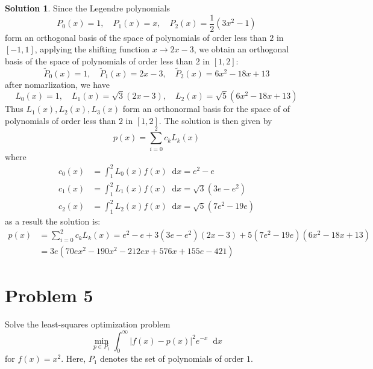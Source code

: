 \documentclass{article}
\newcommand*\diff{\mathop{}\!\mathrm{d}}
\theoremstyle{definition}
\newtheorem{solution}{Solution}
\begin{document}
\begin{solution}
Since the Legendre polynomials
\begin{equation}
  P_0(x)=1,\quad P_1(x)=x, \quad P_2(x)=\frac{1}{2}(3x^2-1)
\end{equation}
form an orthogonal basis of the space of polynomials of order less than $2$  in $[-1,1]$, applying the shifting function $x\to 2x-3$, we obtain an orthogonal basis of the space of polynomials of order less than $2$  in $[1,2]$:
\begin{equation}
  \tilde{P}_0(x)=1,\quad \tilde{P}_1(x)=2x-3, \quad \tilde{P}_2(x)=6x^2-18x+13
\end{equation}
after nomarlization, we have
\begin{equation}
  L_0(x)=1,\quad L_1(x)=\sqrt{3}(2x-3), \quad L_2(x)=\sqrt{5}(6x^2-18x+13)
\end{equation}
Thus $L_1(x),L_2(x), L_3(x)$ form an orthonormal basis for the space of of polynomials of order less than $2$  in $[1,2]$. The solution is then given by 
\begin{equation}
  p(x)=\sum_{i=0}^{2}c_kL_k(x)
\end{equation}
where
\begin{align*}
c_0(x)&=\int_{1}^{2}L_0(x)f(x)\diff x=e^2-e\\
c_1(x)&=\int_{1}^{2}L_1(x)f(x)\diff x=\sqrt{3}(3e-e^2)\\
c_2(x)&=\int_{1}^{2}L_2(x)f(x)\diff x=\sqrt{5}(7e^2-19e)
\end{align*}
as a result the solution is:
\begin{align*}
p(x)&=\sum_{i=0}^{2}c_kL_k(x)=e^2-e+3(3e-e^2)(2x-3)+5(7e^2-19e)(6x^2-18x+13)\\
&=3e(70ex^2-190x^2-212ex+576x+155e-421)
\end{align*}





\end{solution}

\section{Problem 5}
Solve the least-squares optimization problem
\begin{equation}
  \min_{p\in P_1}\int_{0}^\infty|f(x)-p(x)|^2e^{-x}\diff x
\end{equation}
for $f(x) =x^2$. Here, $P_1$ denotes the set of polynomials of order $1$.
\end{document}
